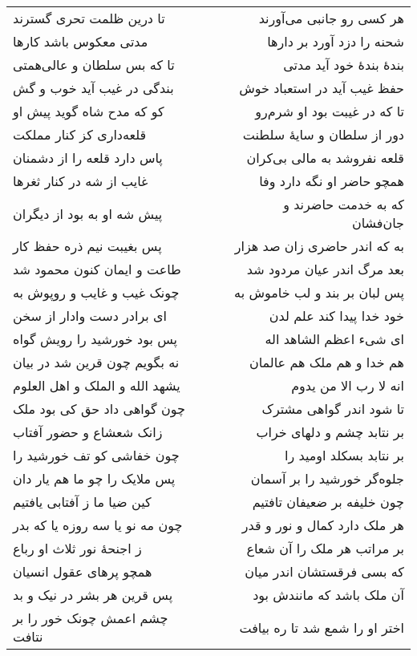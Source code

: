 \begin{center}
\begin{longtable}{l p{0.5cm} r}
تا درین ظلمت تحری گسترند
&&
هر کسی رو جانبی می‌آورند
\\
مدتی معکوس باشد کارها
&&
شحنه را دزد آورد بر دارها
\\
تا که بس سلطان و عالی‌همتی
&&
بندهٔ بندهٔ خود آید مدتی
\\
بندگی در غیب آید خوب و گش
&&
حفظ غیب آید در استعباد خوش
\\
کو که مدح شاه گوید پیش او
&&
تا که در غیبت بود او شرم‌رو
\\
قلعه‌داری کز کنار مملکت
&&
دور از سلطان و سایهٔ سلطنت
\\
پاس دارد قلعه را از دشمنان
&&
قلعه نفروشد به مالی بی‌کران
\\
غایب از شه در کنار ثغرها
&&
همچو حاضر او نگه دارد وفا
\\
پیش شه او به بود از دیگران
&&
که به خدمت حاضرند و جان‌فشان
\\
پس بغیبت نیم ذره حفظ کار
&&
به که اندر حاضری زان صد هزار
\\
طاعت و ایمان کنون محمود شد
&&
بعد مرگ اندر عیان مردود شد
\\
چونک غیب و غایب و روپوش به
&&
پس لبان بر بند و لب خاموش به
\\
ای برادر دست وادار از سخن
&&
خود خدا پیدا کند علم لدن
\\
پس بود خورشید را رویش گواه
&&
ای شیء اعظم الشاهد اله
\\
نه بگویم چون قرین شد در بیان
&&
هم خدا و هم ملک هم عالمان
\\
یشهد الله و الملک و اهل العلوم
&&
انه لا رب الا من یدوم
\\
چون گواهی داد حق کی بود ملک
&&
تا شود اندر گواهی مشترک
\\
زانک شعشاع و حضور آفتاب
&&
بر نتابد چشم و دلهای خراب
\\
چون خفاشی کو تف خورشید را
&&
بر نتابد بسکلد اومید را
\\
پس ملایک را چو ما هم یار دان
&&
جلوه‌گر خورشید را بر آسمان
\\
کین ضیا ما ز آفتابی یافتیم
&&
چون خلیفه بر ضعیفان تافتیم
\\
چون مه نو یا سه روزه یا که بدر
&&
هر ملک دارد کمال و نور و قدر
\\
ز اجنحهٔ نور ثلاث او رباع
&&
بر مراتب هر ملک را آن شعاع
\\
همچو پرهای عقول انسیان
&&
که بسی فرقستشان اندر میان
\\
پس قرین هر بشر در نیک و بد
&&
آن ملک باشد که مانندش بود
\\
چشم اعمش چونک خور را بر نتافت
&&
اختر او را شمع شد تا ره بیافت
\\
\end{longtable}
\end{center}
